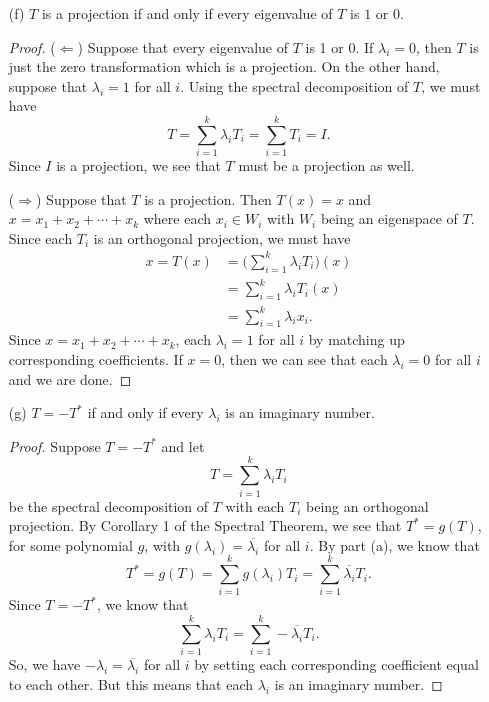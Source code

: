 \begin{enumerate}
\begin{proof}
        \end{proof}
    \item[(f)] \( T  \) is a projection if and only if every eigenvalue of \( T  \) is \( 1  \) or \( 0  \).
        \begin{proof}
            (\( \Leftarrow \)) Suppose that every eigenvalue of \( T  \) is 1 or 0. If \( {\lambda}_{i} = 0  \), then \( T  \) is just the zero transformation which is a projection. 
        On the other hand, suppose that \( {\lambda}_{i} = 1  \) for all \( i \). Using the spectral decomposition of \( T  \), we must have 
        \[  T = \sum_{ i=1  }^{ k  } {\lambda}_{i} {T}_{i} = \sum_{ i=1  }^{ k  } {T}_{i} = I. \]
        Since \( I  \) is a projection, we see that \( T  \) must be a projection as well.
        
        (\( \Rightarrow \)) Suppose that \( T  \) is a projection. Then \( T(x) = x  \) and \( x = {x}_{1} + {x}_{2} + \cdots + {x}_{k} \) where each \( {x}_{i} \in {W}_{i}  \) with \( {W}_{i} \) being an eigenspace of \( T  \). Since each \( {T}_{i} \) is an orthogonal projection, we must have
        \begin{align*}
            x  = T(x) &=  \Big( \sum_{ i=1  }^{ k  } {\lambda}_{i} {T}_{i} \Big)(x)  \\
                      &= \sum_{ i=1  }^{ k  } {\lambda}_{i} {T}_{i}(x) \\ 
                      &= \sum_{ i=1  }^{  k  } {\lambda}_{i} {x}_{i}. 
        \end{align*}
        Since \( x = {x}_{1} + {x}_{2} + \cdots + {x}_{k} \), each \( {\lambda}_{i} = 1  \) for all \( i \) by matching up corresponding coefficients. If \( x = 0  \), then we can see that each \( {\lambda}_{i} = 0  \) for all \( i \) and we are done.
        
        \end{proof}
    \item[(g)] \( T = - T^{*} \) if and only if every \( {\lambda}_{i} \) is an imaginary number.
        \begin{proof}
        Suppose \( T = - T^{*}  \) and let  
        \[ T = \sum_{ i=1  }^{ k  } {\lambda}_{i} {T}_{i}   \]
        be the spectral decomposition of \( T  \) with each \( {T}_{i} \) being an orthogonal projection. By Corollary 1 of the Spectral Theorem, we see that \( T^{*} = g(T)  \), for some polynomial \( g \), with \( g({\lambda}_{i}) = \overline{{\lambda}_{i}} \) for all \( i \). By part (a), we know that   
        \[ T^{*} =  g(T) = \sum_{ i=1  }^{ k  } g({\lambda}_{i}) {T}_{i} = \sum_{ i=1  }^{ k  } \overline{{\lambda}_{i}} {T}_{i}. \]
        Since \( T = - T^{*} \), we know that
        \[  \sum_{ i=1  }^{ k  } {\lambda}_{i} {T}_{i} = \sum_{ i=1  }^{ k } - \overline{{\lambda}_{i}} {T}_{i}.  \]
        So, we have \( - {\lambda}_{i} =  \overline{{\lambda}_{i}}  \) for all \( i \) by setting each corresponding coefficient equal to each other. But this means that each \( {\lambda}_{i} \) is an imaginary number.


\end{proof}
\end{enumerate}
